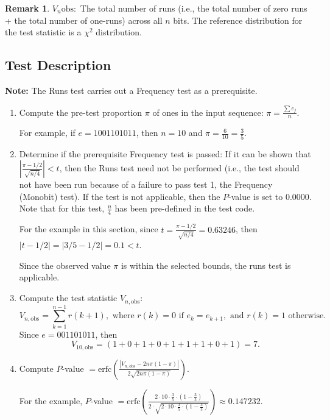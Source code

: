 \documentclass[12pt,openany]{book}
\theoremstyle{definition}
\newtheorem{remark}{Remark}[chapter]
\begin{document}
	\begin{remark}
		\( V_n\text{obs}: \) The total number of runs (i.e., the total number of zero runs + the total number of one-runs) across all \( n \) bits.
		The reference distribution for the test statistic is a \( \chi^2 \) distribution.
	\end{remark}
	\newpage
	\subsection*{Test Description}
	\textbf{Note:} The Runs test carries out a Frequency test as a prerequisite.
	\begin{enumerate}
		\item Compute the pre-test proportion \( \pi \) of ones in the input sequence: \( \pi = \frac{\sum e_j}{n} \).
		
		For example, if \( e = 1001101011 \), then \( n=10 \) and \( \pi = \frac{6}{10} = \frac{3}{5} \).
		
		\item Determine if the prerequisite Frequency test is passed: If it can be shown that \( | \frac{\pi - 1/2}{\sqrt{n/4}} | < t \), then the Runs test need not be performed (i.e., the test should not have been run because of a failure to pass test 1, the Frequency (Monobit) test). If the test is not applicable, then the \( P \)-value is set to 0.0000. Note that for this test, \( \frac{n}{4} \) has been pre-defined in the test code.
		
		For the example in this section, since \( t = \frac{\pi - 1/2}{\sqrt{n/4}} = 0.63246 \), then \( |t - 1/2| = |3/5 - 1/2| = 0.1 < t \).
		
		Since the observed value \( \pi \) is within the selected bounds, the runs test is applicable.
	\end{enumerate}

	\begin{enumerate}
		\setcounter{enumi}{2} %
		\item Compute the test statistic \( V_{n,\text{obs}} \):
		\[
		V_{n,\text{obs}} = \sum_{k=1}^{n-1} r(k+1), \text{ where } r(k)=0 \text{ if } e_k = e_{k+1}, \text{ and } r(k)=1 \text{ otherwise}.
		\]
		Since \( e = 001101011 \), then
		\[
		V_{10,\text{obs}} = (1+0+1+0+1+1+1+0+1) = 7.
		\]
		
		\item Compute \( P \)-value \( = \text{erfc} \left( \frac{|V_{n,\text{obs}} - 2n\pi(1 - \pi)|}{2\sqrt{2n\pi(1 - \pi)}} \right) \).
		
		For the example, \( P \)-value \( = \text{erfc} \left( \frac{2 \cdot 10 \cdot \frac{3}{5} \cdot \left(1 - \frac{3}{5}\right)}{2 \cdot \sqrt{2 \cdot 10 \cdot \frac{3}{5} \cdot \left(1 - \frac{3}{5}\right)}} \right) \approx 0.147232.
		\)
	\end{enumerate}
	
\end{document}
